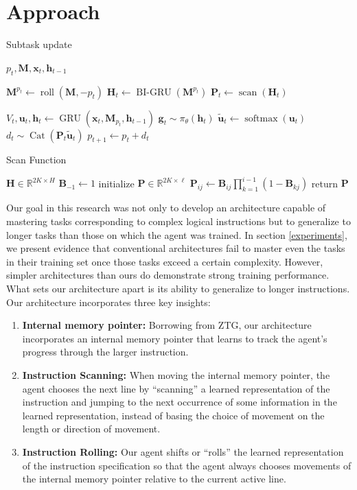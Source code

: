 \documentclass{article}
\newcommand{\algo}[3][
    \STATE $V_t, \mathbf{u}_t, \mathbf{h}_t  \gets \GRU\left(\mathbf{x}_t, \mathbf{M}_{p_t}, \mathbf{h}_{t-1}\right)$
    \STATE $\mathbf{g}_{t} \sim \pi_\theta\left(\mathbf{h}_t\right)$
    \STATE $\tilde{\mathbf{u}}_{t} \gets \softmax\left(\mathbf{u}_t\right)$
    \STATE $d_{t} \sim \Cat\left(\mathbf{P}_t\tilde{\mathbf{u}}_t\right)$ 
    \STATE $p_{t + 1} \gets p_t + d_t$
]
{

\begin{algorithm}[b]
  \caption{#2}
  \label{subtask-update}
  \begin{algorithmic}[1]
    \STATE {\bfseries Inputs:} $p_t, \mathbf{M} , \mathbf{x}_t, \mathbf{h}_{t-1}$
    #3
    #1
  \end{algorithmic}
\end{algorithm}
}
\DeclareMathOperator{\GRU}{GRU}
\DeclareMathOperator{\BIGRU}{BI-GRU}
\DeclareMathOperator{\Cat}{Cat}
\DeclareMathOperator{\roll}{roll}
\DeclareMathOperator{\scan}{scan}
\DeclareMathOperator{\softmax}{softmax}
\begin{document}
\section{Approach}
\algo{Subtask update}{
    \STATE $\mathbf{M}^{p_t} \gets \roll\left(\mathbf{M}, -p_t\right)$
    \STATE ${\mathbf{H}_t} \gets \BIGRU\left(\mathbf{M}^{p_t}\right)$
    \STATE ${\mathbf{P}_t \gets \scan\left(\mathbf{H}_t\right)}$
}{}{}
\begin{algorithm}[b]
  \caption{Scan Function}
  \label{scan}
  \begin{algorithmic}[1]
$\mathbf{H} \in \mathbb{R}^{2K \times H}$ 
\STATE $\mathbf{B}_{-1} \gets 1$  
\STATE initialize $\mathbf{P} \in \mathbb{R}^{2K \times \ell}$
\STATE $\mathbf{P}_{ij} \gets \mathbf{B}_{ij}\prod_{k=1}^{i-1}\left(1 -
\mathbf{B}_{kj}\right)$
\ENDFOR
\ENDFOR
\STATE return $\mathbf{P}$
  \end{algorithmic}
\end{algorithm}

\label{approach}
Our goal in this research was not only to develop an architecture capable of
mastering tasks corresponding to complex logical instructions but to generalize
to longer tasks than those on which the agent was trained.
In section \ref{experiments}, we present evidence that conventional architectures
fail to master even the tasks in their training set once those tasks exceed a
certain complexity.
However, simpler architectures than ours do demonstrate strong training
performance.  What sets our architecture apart is
its ability to generalize to longer instructions. Our architecture incorporates three
key insights:

\begin{enumerate}
  \item \textbf{Internal memory pointer:} Borrowing from ZTG, our architecture incorporates an
    internal memory pointer that learns to track the agent's progress through
    the larger instruction.
  \item \textbf{Instruction Scanning:} When moving the internal memory pointer, the agent
    chooses the next line by ``scanning'' a learned representation of the  instruction and
    jumping to the next occurrence of some information in the learned
    representation, instead of basing the choice of movement on
    the length or direction of movement.
  \item \textbf{Instruction Rolling:} Our agent shifts or ``rolls'' the learned representation of the instruction
    specification so that the agent always chooses movements of the internal memory pointer
    relative to the current active line.
\end{enumerate}
\end{document}
